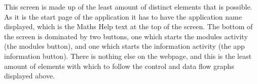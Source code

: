 \documentclass{article}
\begin{document}
\begin{figure}[H]
	\centering
	\caption{}
	\label{figure:applicationStartPage}
\end{figure}

This screen is made up of the least amount of distinct elements that is possible. As it is the start page of the application it has to have the application name displayed, which is the Maths Help text at the top of the screen. The bottom of the screen is dominated by two buttons, one which starts the modules activity (the modules button), and one which starts the information activity (the app information button). There is nothing else on the webpage, and this is the least amount of elements with which to follow the control and data flow graphs displayed above. \\
\end{document}
